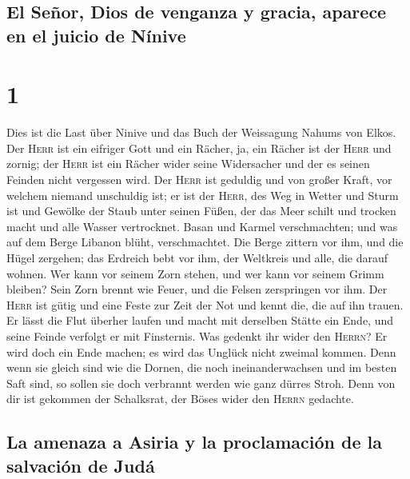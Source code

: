 \hypertarget{el-seuxf1or-dios-de-venganza-y-gracia-aparece-en-el-juicio-de-nuxednive}{%
\subsection{El Señor, Dios de venganza y gracia, aparece en el juicio de
Nínive}\label{el-seuxf1or-dios-de-venganza-y-gracia-aparece-en-el-juicio-de-nuxednive}}

\hypertarget{section}{%
\section{1}\label{section}}

 Dies ist die Last über Ninive und das Buch der Weissagung
Nahums von Elkos.  Der \textsc{Herr} ist ein eifriger Gott
und ein Rächer, ja, ein Rächer ist der \textsc{Herr} und zornig; der
\textsc{Herr} ist ein Rächer wider seine Widersacher und der es seinen
Feinden nicht vergessen wird.  Der \textsc{Herr} ist
geduldig und von großer Kraft, vor welchem niemand unschuldig ist; er
ist der \textsc{Herr}, des Weg in Wetter und Sturm ist und Gewölke der
Staub unter seinen Füßen,  der das Meer schilt und trocken
macht und alle Wasser vertrocknet. Basan und Karmel verschmachten; und
was auf dem Berge Libanon blüht, verschmachtet.  Die Berge
zittern vor ihm, und die Hügel zergehen; das Erdreich bebt vor ihm, der
Weltkreis und alle, die darauf wohnen.  Wer kann vor
seinem Zorn stehen, und wer kann vor seinem Grimm bleiben? Sein Zorn
brennt wie Feuer, und die Felsen zerspringen vor ihm.  Der
\textsc{Herr} ist gütig und eine Feste zur Zeit der Not und kennt die,
die auf ihn trauen.  Er lässt die Flut überher laufen und
macht mit derselben Stätte ein Ende, und seine Feinde verfolgt er mit
Finsternis.  Was gedenkt ihr wider den \textsc{Herrn}? Er
wird doch ein Ende machen; es wird das Unglück nicht zweimal kommen.
 Denn wenn sie gleich sind wie die Dornen, die noch
ineinanderwachsen und im besten Saft sind, so sollen sie doch verbrannt
werden wie ganz dürres Stroh.  Denn von dir ist gekommen
der Schalksrat, der Böses wider den \textsc{Herrn} gedachte.

\hypertarget{la-amenaza-a-asiria-y-la-proclamaciuxf3n-de-la-salvaciuxf3n-de-juduxe1}{%
\subsection{La amenaza a Asiria y la proclamación de la salvación de
Judá}\label{la-amenaza-a-asiria-y-la-proclamaciuxf3n-de-la-salvaciuxf3n-de-juduxe1}}

